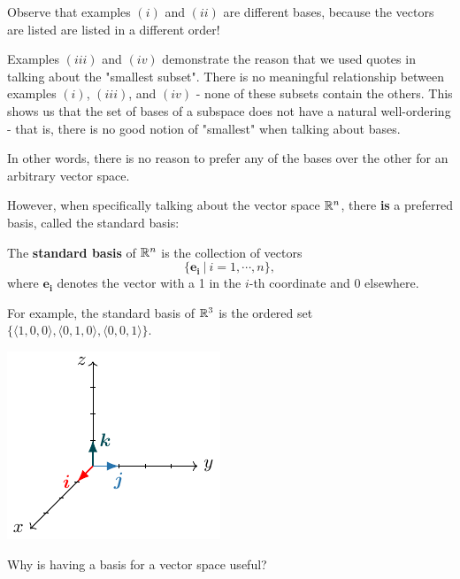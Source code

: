     Observe that examples $(i)$ and $(ii)$ are different bases, because the vectors are listed are listed in a different order!
    
    Examples $(iii)$ and $(iv)$ demonstrate the reason that we used quotes in talking about the "smallest subset".  There is no meaningful relationship between examples $(i)$, $(iii)$, and $(iv)$  - none of these subsets contain the others.  This shows us that the set of bases of a subspace does not have a natural well-ordering - that is, there is no good notion of "smallest" when talking about bases.  
    
    In other words, there is no reason to prefer any of the bases over the other for an arbitrary vector space.
    
    However, when specifically talking about the vector space $\mathbb{R}^n$, there \textbf{is} a preferred basis, called the standard basis:
    
    \begin{definition}
    The \textbf{standard basis} of $\mathbb{R}^n$ is the collection of vectors $$\{\bm{e_i} \ | \ i = 1, \cdots, n\},$$ where $\bm{e_i}$ denotes the vector with a 1 in the $i$-th coordinate and 0 elsewhere.
    \end{definition}
    
    \begin{example}\label{basisr3}
    For example, the standard basis of $\mathbb{R}^3$ is the ordered set $\{ \langle 1,0,0\rangle, \langle0,1,0\rangle, \langle0,0,1\rangle\}$.

    
 \begin{center}        
        \includegraphics{chapters/1-LinearAlgebra/figures/figures-standardbasis.pdf}
    \end{center}
    \end{example}
    
    \begin{motivating}
    Why is having a basis for a vector space useful?
    \end{motivating}
    
